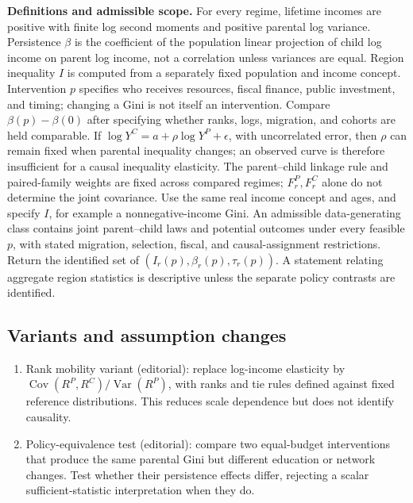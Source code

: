 \documentclass[11pt,a4paper]{article}
\begin{document}
\textbf{Definitions and admissible scope.} For every regime, lifetime incomes are positive with finite log second moments and positive parental log variance. Persistence \(\beta\) is the coefficient of the population linear projection of child log income on parent log income, not a correlation unless variances are equal. Region inequality \(I\) is computed from a separately fixed population and income concept. Intervention \(p\) specifies who receives resources, fiscal finance, public investment, and timing; changing a Gini is not itself an intervention. Compare \(\beta(p)-\beta(0)\) after specifying whether ranks, logs, migration, and cohorts are held comparable. If \(\log Y^C=a+\rho\log Y^P+\epsilon\), with uncorrelated error, then \(\rho\) can remain fixed when parental inequality changes; an observed curve is therefore insufficient for a causal inequality elasticity. The parent--child linkage rule and paired-family weights are fixed across compared regimes; \(F^P_r,F^C_r\) alone do not determine the joint covariance. Use the same real income concept and ages, and specify \(I\), for example a nonnegative-income Gini. An admissible data-generating class contains joint parent--child laws and potential outcomes under every feasible \(p\), with stated migration, selection, fiscal, and causal-assignment restrictions. Return the identified set of \((I_r(p),\beta_r(p),\tau_r(p))\). A statement relating aggregate region statistics is descriptive unless the separate policy contrasts are identified.
\subsection*{Variants and assumption changes}
\begin{enumerate}
\item Rank mobility variant (editorial): replace log-income elasticity by \(\operatorname{Cov}(R^P,R^C)/\operatorname{Var}(R^P)\), with ranks and tie rules defined against fixed reference distributions. This reduces scale dependence but does not identify causality.
\item Policy-equivalence test (editorial): compare two equal-budget interventions that produce the same parental Gini but different education or network changes. Test whether their persistence effects differ, rejecting a scalar sufficient-statistic interpretation when they do.
\end{enumerate}
\end{document}
